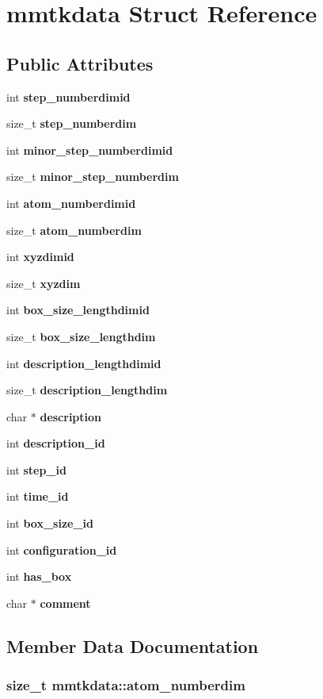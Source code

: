 \section{mmtkdata  Struct Reference}
\label{structmmtkdata}
\subsection*{Public Attributes}
\begin{CompactItemize}
\item 
int {\bf step\_\-numberdimid}
\item 
size\_\-t {\bf step\_\-numberdim}
\item 
int {\bf minor\_\-step\_\-numberdimid}
\item 
size\_\-t {\bf minor\_\-step\_\-numberdim}
\item 
int {\bf atom\_\-numberdimid}
\item 
size\_\-t {\bf atom\_\-numberdim}
\item 
int {\bf xyzdimid}
\item 
size\_\-t {\bf xyzdim}
\item 
int {\bf box\_\-size\_\-lengthdimid}
\item 
size\_\-t {\bf box\_\-size\_\-lengthdim}
\item 
int {\bf description\_\-lengthdimid}
\item 
size\_\-t {\bf description\_\-lengthdim}
\item 
char $\ast$ {\bf description}
\item 
int {\bf description\_\-id}
\item 
int {\bf step\_\-id}
\item 
int {\bf time\_\-id}
\item 
int {\bf box\_\-size\_\-id}
\item 
int {\bf configuration\_\-id}
\item 
int {\bf has\_\-box}
\item 
char $\ast$ {\bf comment}
\end{CompactItemize}


\subsection{Member Data Documentation}
\subsubsection{\setlength{\rightskip}{0pt plus 5cm}size\_\-t mmtkdata::atom\_\-numberdim}\label{structmmtkdata_m5}




